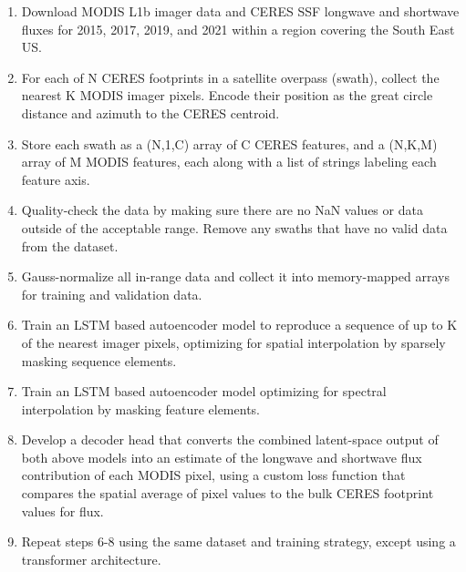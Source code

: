 \documentclass[12pt]{article}
\begin{document}
\begin{enumerate}[itemsep=0pt, parsep=0pt, before=\setlength{\baselineskip}{6mm}]
    \item Download MODIS L1b imager data and CERES SSF longwave and shortwave fluxes for 2015, 2017, 2019, and 2021 within a region covering the South East US.
    \item For each of N CERES footprints in a satellite overpass (swath), collect the nearest K MODIS imager pixels. Encode their position as the great circle distance and azimuth to the CERES centroid.
    \item Store each swath as a (N,1,C) array of C CERES features, and a (N,K,M) array of M MODIS features, each along with a list of strings labeling each feature axis.
    \item Quality-check the data by making sure there are no NaN values or data outside of the acceptable range. Remove any swaths that have no valid data from the dataset.
    \item Gauss-normalize all in-range data and collect it into memory-mapped arrays for training and validation data.
    \item Train an LSTM based autoencoder model to reproduce a sequence of up to K of the nearest imager pixels, optimizing for spatial interpolation by sparsely masking sequence elements.
    \item Train an LSTM based autoencoder model optimizing for spectral interpolation by masking feature elements.
    \item Develop a decoder head that converts the combined latent-space output of both above models into an estimate of the longwave and shortwave flux contribution of each MODIS pixel, using a custom loss function that compares the spatial average of pixel values to the bulk CERES footprint values for flux.
    \item Repeat steps 6-8 using the same dataset and training strategy, except using a transformer architecture.
\end{enumerate}


\newpage


\end{document}
